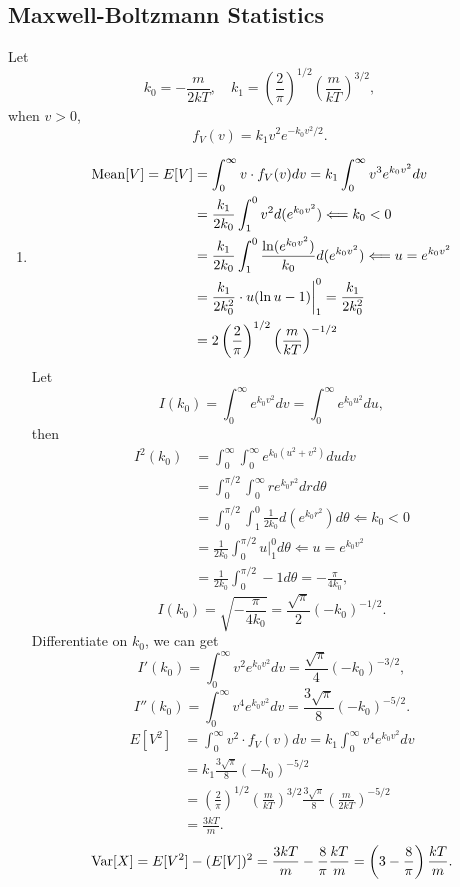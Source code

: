 \documentclass[11pt,a4paper]{article}
\begin{document}
\subsection{Maxwell-Boltzmann Statistics}
Let $$k_0=-\frac{m}{2kT},\quad k_1=\left(\frac{2}{\pi}\right)^{1/2}\left(\frac{m}{kT}\right)^{3/2},$$
when $v>0$,
$$f_V(v)=k_1v^2e^{-k_0v^2/2}.$$
\begin{enumerate}[label=\roman*)]
\item
\begin{align*}
{\rm Mean}[V]=E[V]&=\int_0^\infty v\cdot f_V(v)dv=k_1\int_0^\infty v^3e^{k_0v^2}dv\\
&=\frac{k_1}{2k_0}\int_1^0 v^2d(e^{k_0v^2})\Longleftarrow k_0<0\\
&=\frac{k_1}{2k_0}\int_1^0 \frac{\ln(e^{k_0v^2})}{k_0}d(e^{k_0v^2})\Longleftarrow u=e^{k_0v^2}\\
&=\frac{k_1}{2k_0^2}\cdot u(\ln u-1)\bigg|_1^0=\frac{k_1}{2k_0^2}\\
&=2\left(\frac{2}{\pi}\right)^{1/2}\left(\frac{m}{kT}\right)^{-1/2}
\end{align*}
Let
$$I(k_0)=\int_0^\infty e^{k_0v^2}dv=\int_0^\infty e^{k_0u^2}du,$$
then
\begin{align*}
I^2(k_0)&=\int_0^\infty\int_0^\infty e^{k_0(u^2+v^2)}dudv\\
&=\int_0^{\pi/2}\int_0^\infty re^{k_0r^2}drd\theta\\
&=\int_0^{\pi/2}\int_1^0 \frac{1}{2k_0} d(e^{k_0r^2})d\theta\Longleftarrow k_0<0\\
&=\frac{1}{2k_0}\int_0^{\pi/2}u\bigg|_1^0d\theta\Longleftarrow u=e^{k_0v^2}\\
&=\frac{1}{2k_0}\int_0^{\pi/2}-1d\theta=-\frac{\pi}{4k_0},
\end{align*}
$$I(k_0)=\sqrt{-\frac{\pi}{4k_0}}=\frac{\sqrt{\pi}}{2}(-k_0)^{-1/2}.$$
Differentiate on $k_0$, we can get
$$I'(k_0)=\int_0^\infty v^2e^{k_0v^2}dv=\frac{\sqrt{\pi}}{4}(-k_0)^{-3/2},$$
$$I''(k_0)=\int_0^\infty v^4e^{k_0v^2}dv=\frac{3\sqrt{\pi}}{8}(-k_0)^{-5/2}.$$
\begin{align*}
E[V^2]&=\int_0^\infty v^2\cdot f_V(v)dv=k_1\int_0^\infty v^4e^{k_0v^2}dv\\
&=k_1\frac{3\sqrt{\pi}}{8}(-k_0)^{-5/2}\\
&=\left(\frac{2}{\pi}\right)^{1/2}\left(\frac{m}{kT}\right)^{3/2}\frac{3\sqrt{\pi}}{8}\left(\frac{m}{2kT}\right)^{-5/2}\\
&=\frac{3kT}{m}.
\end{align*}
$${\rm Var}[X]=E[V^2]-(E[V])^2=\frac{3kT}{m}-\frac{8}{\pi}\frac{kT}{m}=\left(3-\frac{8}{\pi}\right)\frac{kT}{m}.$$

\end{enumerate}
\end{document}

